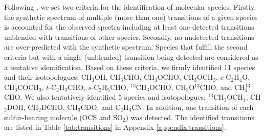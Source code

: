 \documentclass[linenumbers, twocolumn, twocolappendix, astrosymb, times]{aastex631}
\newcommand{\methanol}{CH$_3$OH\xspace}
\newcommand{\acetaldehyde}{CH$_3$CHO\xspace}
\newcommand{\methylformate}{CH$_3$OCHO\xspace}
\newcommand{\dimethylether}{CH$_3$OCH$_3$\xspace}
\newcommand{\acetone}{CH$_3$COCH$_3$\xspace}
\newcommand{\ethyleneoxide}{$c$-C$_2$H$_4$O\xspace}
\newcommand{\propenal}{$t$-C$_2$H$_3$CHO\xspace}
\newcommand{\propanal}{$s$-C$_2$H$_5$CHO\xspace}
\begin{document}
Following \citet{Jorgensen2020}, we set two criteria for the identification of molecular species. Firstly, the synthetic spectrum of multiple (more than one) transitions of a given species is accounted for the observed spectra including at least one detected transitions unblended with transitions of other species. Secondly, no undetected transitions are over-predicted with the synthetic spectrum. Species that fulfill the second criteria but with a single (unblended) transition being detected are considered as a tentative identification. Based on these criteria, we firmly identified 11 species and their isotopologues: \methanol, \acetaldehyde, \methylformate, \dimethylether, \ethyleneoxide, \acetone, \propenal, \propanal, $^{13}$CH$_3$OCHO, CH$_3$O$^{13}$CHO, and CH$_3^{13}$CHO. We also tentatively identified 5 species and isotopologues: $^{13}$CH$_3$OCH$_3$, CH$_2$DOH, CH$_2$DCHO, CH$_3$CDO, and C$_2$H$_3$CN. In addition, one transition of each sulfur-bearing molecule (OCS and SO$_2$) was detected. The identified transitions are listed in Table \ref{tab:transitions} in Appendix \ref{appendix:transitions}.




\begin{figure*}
\caption{Spectra corrected for Keplerian rotation toward the V883 Ori disk (grey). The model spectra for each species are shown in colored lines. }
\label{fig:spectra_gallery}
\end{figure*}

\begin{figure*}
\caption{Velocity-integrated intensity maps of the molecular line emission in the V883 Ori disk. The velocity range for integration are $\pm3.5$ km s$^{-1}$ with respect to the source systemic velocity $v_\mathrm{sys}=4.25$ km s$^{-1}$ \citep{Tobin2023} including \dimethylether and \acetone, where multiple blended transitions are integrated together. The molecular species, transitions, and upper state energy levels are indicated in the upper-left corner of each panel. The black contours start from 5$\sigma$ with steps of 2.5$\sigma$, where $\sigma$ are the noise level of each map measured on the emission-free region. The synthesized beam and a scale bar of 80 au are shown in the lower left and right corner of each panel, respectively.}
\label{fig:moment_zero_gallery}
\end{figure*}
\end{document}
